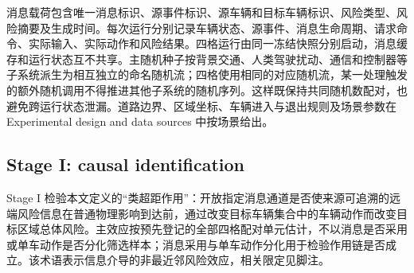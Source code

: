\documentclass[10pt,a4paper,twocolumn]{article}
\begin{document}
消息载荷包含唯一消息标识、源事件标识、源车辆和目标车辆标识、风险类型、风险摘要及生成时间。每次运行分别记录车辆状态、源事件、消息生命周期、请求命令、实际输入、实际动作和风险结果。四格运行由同一冻结快照分别启动，消息缓存和运行状态互不共享。主随机种子按背景交通、人类驾驶扰动、通信和控制器等子系统派生为相互独立的命名随机流；四格使用相同的对应随机流，某一处理触发的额外随机调用不得推进其他子系统的随机序列。这样既保持共同随机数配对，也避免跨运行状态泄漏。道路边界、区域坐标、车辆进入与退出规则及场景参数在 Experimental design and data sources 中按场景给出。

\subsection*{Stage I: causal identification}
Stage I 检验本文定义的“类超距作用”：开放指定消息通道是否使来源可追溯的远端风险信息在普通物理影响到达前，通过改变目标车辆集合中的车辆动作而改变目标区域总体风险。主效应按预先登记的全部四格配对单元估计，不以消息是否采用或单车动作是否分化筛选样本；消息采用与单车动作分化用于检验作用链是否成立。该术语表示信息介导的非最近邻风险效应，相关限定见脚注。
\end{document}
